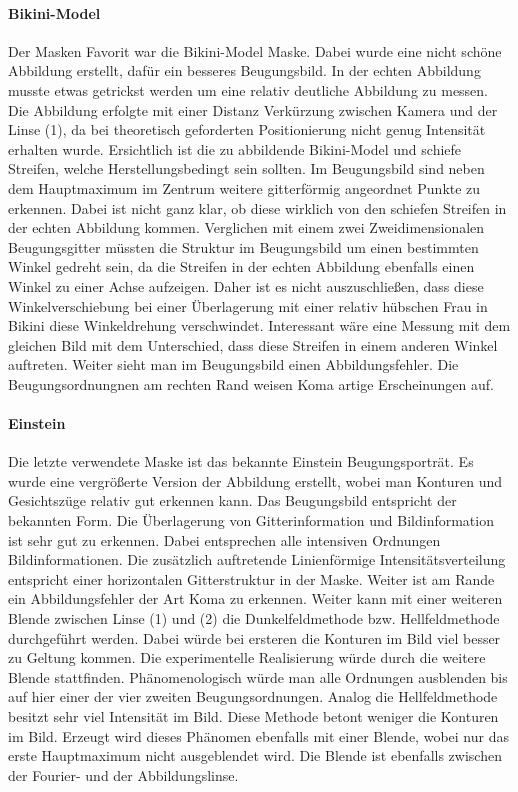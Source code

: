\paragraph{Bikini-Model} Der Masken Favorit war die Bikini-Model Maske. Dabei wurde eine nicht schöne Abbildung erstellt, dafür ein besseres Beugungsbild. In der echten Abbildung musste etwas getrickst werden um eine relativ deutliche Abbildung zu messen. Die Abbildung erfolgte mit einer Distanz Verkürzung zwischen Kamera und der Linse (1), da bei theoretisch geforderten Positionierung nicht genug Intensität erhalten wurde. Ersichtlich ist die zu abbildende Bikini-Model und schiefe Streifen, welche Herstellungsbedingt sein sollten. Im Beugungsbild sind neben dem Hauptmaximum im Zentrum weitere gitterförmig angeordnet Punkte zu erkennen. Dabei ist nicht ganz klar, ob diese wirklich von den schiefen Streifen in der echten Abbildung kommen. Verglichen mit einem zwei Zweidimensionalen Beugungsgitter müssten die Struktur im Beugungsbild um einen bestimmten Winkel gedreht sein, da die Streifen in der echten Abbildung ebenfalls einen Winkel zu einer Achse aufzeigen. Daher ist es nicht auszuschließen, dass diese Winkelverschiebung bei einer Überlagerung mit einer relativ hübschen Frau in Bikini diese Winkeldrehung verschwindet. Interessant wäre eine Messung mit dem gleichen Bild mit dem Unterschied, dass diese Streifen in einem anderen Winkel auftreten. Weiter sieht man im Beugungsbild einen Abbildungsfehler. Die Beugungsordnungnen am rechten Rand weisen Koma artige Erscheinungen auf.

\paragraph{Einstein} Die letzte verwendete Maske ist das bekannte Einstein Beugungsporträt. Es wurde eine vergrößerte Version der Abbildung erstellt, wobei man Konturen und Gesichtszüge relativ gut erkennen kann. Das Beugungsbild entspricht der bekannten Form. Die Überlagerung von Gitterinformation und Bildinformation ist sehr gut zu erkennen. Dabei entsprechen alle intensiven Ordnungen Bildinformationen. Die zusätzlich auftretende Linienförmige Intensitätsverteilung entspricht einer horizontalen Gitterstruktur in der Maske. Weiter ist am Rande ein Abbildungsfehler der Art Koma zu erkennen. Weiter kann mit einer weiteren Blende zwischen Linse (1) und (2) die Dunkelfeldmethode bzw. Hellfeldmethode durchgeführt werden. Dabei würde bei ersteren die Konturen im Bild viel besser zu Geltung kommen. Die experimentelle Realisierung würde durch die weitere Blende stattfinden. Phänomenologisch würde man alle Ordnungen ausblenden bis auf hier einer der vier zweiten Beugungsordnungen. Analog die Hellfeldmethode besitzt sehr viel Intensität im Bild. Diese Methode betont weniger die Konturen im Bild. Erzeugt wird dieses Phänomen ebenfalls mit einer Blende, wobei nur das erste Hauptmaximum nicht ausgeblendet wird. Die Blende ist ebenfalls zwischen der Fourier- und der Abbildungslinse.


